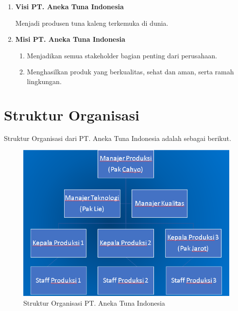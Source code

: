 \begin{enumerate}[nolistsep]

  \item \textbf{Visi PT. Aneka Tuna Indonesia}
  \vspace{0.5ex}

  Menjadi produsen tuna kaleng terkemuka di dunia.
  \vspace{0.5ex}

  \item \textbf{Misi PT. Aneka Tuna Indonesia}
  \vspace{0.5ex}

  \begin{enumerate}[nolistsep]

    \item Menjadikan semua stakeholder bagian penting dari perusahaan.
    \vspace{0.5ex}

    \item Menghasilkan produk yang berkualitas, sehat dan aman, serta ramah lingkungan.
    \vspace{0.5ex}

  \end{enumerate}
  \vspace{0.5ex}

\end{enumerate}
\vspace{0.5ex}

\section{Struktur Organisasi}
\vspace{1ex}

Struktur Organisasi dari PT. Aneka Tuna Indonesia adalah sebagai berikut.
\vspace{0.5ex}

\begin{figure} [ht] \centering
  \includegraphics[scale=0.45]{gambar/hirarki-ATI.png}
  \caption{Struktur Organisasi PT. Aneka Tuna Indonesia}
	\label{fig:strukturOrganisasi}
\end{figure}


